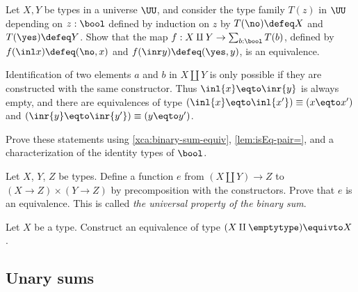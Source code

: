 \begin{xca}\label{xca:binary-sum-equiv}
  Let $X,Y$ be types in a universe $\UU$, and consider the type family
  $T(z)$ in $\UU$ depending on $z:\bool$ defined by induction on $z$ by
  $T(\no)\defeq X$ and $T(\yes) \defeq Y$.
  Show that the map $f : X\amalg Y \to \sum_{b:\bool}T(b)$,
  defined by $f (\inl x) \defeq (\no,x)$ and $f(\inr y) \defeq (\yes,y)$,
  is an equivalence.
\end{xca}

Identification of two elements $a$ and $b$ in $X \amalg Y$ is
only possible if they are constructed with the same constructor.
Thus $\inl{x} \eqto \inr{y}$ is always empty, and there are equivalences of type
$(\inl{x} \eqto \inl{x'}) \equiv (x \eqto x')$ and 
$(\inr{y} \eqto \inr{y'}) \equiv (y \eqto y')$.

\begin{xca}\label{xca:binary-sum-id}
  Prove these statements using \cref{xca:binary-sum-equiv},
  \cref{lem:isEq-pair=}, and a characterization
  of the identity types of $\bool$.
\end{xca}

\begin{xca}\label{xca:bin-sum-univ-prop}
  Let $X$, $Y$, $Z$ be types. Define a function $e$ from
  $(X\amalg Y)\to Z$ to $(X\to Z)\times(Y\to Z)$ by precomposition
  with the constructors. 
  Prove that $e$ is an equivalence.
  This is called \emph{the universal property of the binary sum}.
\end{xca}

\begin{xca}
  Let $X$ be a type.  Construct an equivalence of type $(X \amalg \emptytype) \equivto X$.
\end{xca}

\subsection{Unary sums}\label{sec:unary-sum-types}

